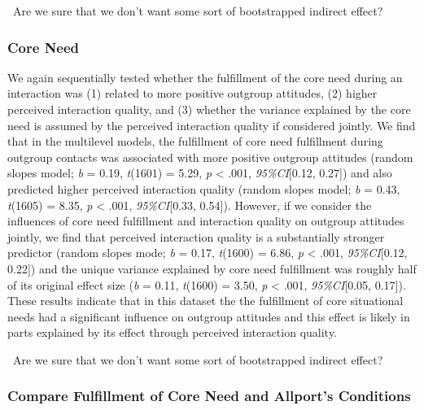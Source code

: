 \faQuestionCircle~Are we sure that we don't want some sort of
bootstrapped indirect effect?

\subsubsection{Core Need}

We again sequentially tested whether the fulfillment of the core need
during an interaction was (1) related to more positive outgroup
attitudes, (2) higher perceived interaction quality, and (3) whether the
variance explained by the core need is assumed by the perceived
interaction quality if considered jointly. We find that in the
multilevel models, the fulfillment of core need fulfillment during
outgroup contacts was associated with more positive outgroup attitudes
(random slopes model; \textit{b} = 0.19, \textit{t}(1601) = 5.29,
\textit{p} \textless{} .001, \textit{95\%CI}{[}0.12, 0.27{]}) and also
predicted higher perceived interaction quality (random slopes model;
\textit{b} = 0.43, \textit{t}(1605) = 8.35, \textit{p} \textless{} .001,
\textit{95\%CI}{[}0.33, 0.54{]}). However, if we consider the influences
of core need fulfillment and interaction quality on outgroup attitudes
jointly, we find that perceived interaction quality is a substantially
stronger predictor (random slopes mode; \textit{b} = 0.17,
\textit{t}(1600) = 6.86, \textit{p} \textless{} .001,
\textit{95\%CI}{[}0.12, 0.22{]}) and the unique variance explained by
core need fulfillment was roughly half of its original effect size
(\textit{b} = 0.11, \textit{t}(1600) = 3.50, \textit{p} \textless{}
.001, \textit{95\%CI}{[}0.05, 0.17{]}). These results indicate that in
this dataset the the fulfillment of core situational needs had a
significant influence on outgroup attitudes and this effect is likely in
parts explained by its effect through perceived interaction quality.

\faQuestionCircle~Are we sure that we don't want some sort of
bootstrapped indirect effect?

\subsubsection{Compare Fulfillment of Core Need and Allport's Conditions}

